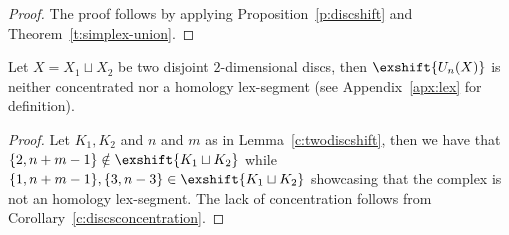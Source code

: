 \begin{proof}
    The proof follows by applying Proposition~\ref{p:discshift} and Theorem~\ref{t:simplex-union}.
\end{proof}
%
\begin{corollary}
    Let $X=X_1\sqcup X_2$ be two disjoint $2$-dimensional discs, then $\exshift{U_n(X)}$ is neither concentrated nor a homology lex-segment (see Appendix~\ref{apx:lex} for definition).
\end{corollary}
\begin{proof}
    Let $K_1,K_2$ and $n$ and $m$ as in Lemma~\ref{c:twodiscshift}, then we have that $\{2,n+m-1\}\notin \exshift{K_1\sqcup K_2}$ while $\{1,n+m-1\},\{3,n-3\}\in \exshift{K_1\sqcup K_2}$ showcasing that the complex is not an homology lex-segment. The lack of concentration follows from  Corollary~\ref{c:discsconcentration}.
\end{proof}
%
\noindent
%
%
